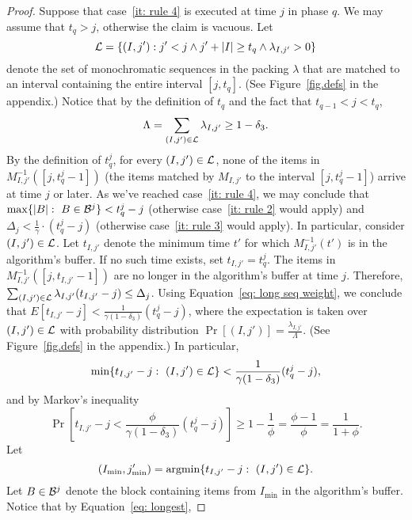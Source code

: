 \documentclass[11pt]{article}
\DeclareMathOperator{\argmin}{argmin}
\begin{document}
\begin{proof}
Suppose that case~\ref{it: rule 4} is executed at time $j$
in phase $q$.
We may assume that $t_q > j$, otherwise the claim is
vacuous. Let
$$
{\cal L} = \{(I,j'): j' < j\wedge j'+|I|\ge t_q
\wedge \lambda_{I,j'} > 0\}
$$
denote the set of monochromatic sequences
in the packing $\lambda$ that are matched
to an interval containing the entire interval
$[j,t_q]$. (See Figure~\ref{fig.defs} in the
appendix.)
Notice that by the definition of $t_q$ and the fact
that $t_{q-1} < j < t_q$,
\begin{equation}\label{eq: long seq weight}
\Lambda = \sum_{(I,j')\in{\cal L}} \lambda_{I,j'}\ge 1 - \delta_3.
\end{equation}
By the definition of $t^j_q$, for every $(I,j')\in {\cal L}$,
none of the items in $M^{-1}_{I,j'}([j,t^j_q-1])$ (the items
matched by $M_{I,j'}$ to the interval $[j,t^j_q-1]$) arrive
at time $j$ or later. As we've reached case~\ref{it: rule 4},
we may conclude that $\max\{|B|:\ B\in {\cal B}^j\} < t^j_q-j$
(otherwise case~\ref{it: rule 2} would apply)
and $\Delta_j < \frac 1 \gamma\cdot (t^j_q-j)$
(otherwise case~\ref{it: rule 3} would apply).
In particular, consider $(I,j')\in {\cal L}$.
Let $t_{I,j'}$ denote the minimum time $t'$
for which $M^{-1}_{I,j'}(t')$ is in the algorithm's
buffer. If no such time exists, set $t_{I,j'} = t^j_q$.
The items in $M^{-1}_{I,j'}([j,t_{I,j'}-1])$ are no longer
in the algorithm's buffer at time $j$. Therefore,
$\sum_{(I,j')\in {\cal L}} \lambda_{I,j'} (t_{I,j'} - j)
\le\Delta_j$. Using Equation~\eqref{eq: long seq weight},
we conclude that
$E[t_{I,j'} - j] < \frac{1}{\gamma (1 - \delta_3)} (t^j_q - j)$,
where the expectation is taken over $(I,j')\in {\cal L}$
with probability distribution
$\Pr[(I,j')] = \frac{\lambda_{I,j'}}{\Lambda}$.
(See Figure~\ref{fig.defs} in the appendix.)
In particular,
\begin{equation}\label{eq: longest}
\min\{t_{I,j'} - j:\ (I,j')\in {\cal L}\} < \frac{1}{\gamma (1 - \delta_3)} (t^j_q - j),
\end{equation}
and by Markov's inequality
\begin{equation}\label{eq: weight of long}
\Pr\left[t_{I,j'} - j < \frac{\phi}{\gamma (1 - \delta_3)} (t^j_q - j)\right] \ge
1 - \frac{1}{\phi} = \frac{\phi-1}{\phi} = \frac{1}{1+\phi}.
\end{equation}
Let
$$
(I_{\min},j'_{\min}) = \argmin\{t_{I,j'} - j:\ (I,j')\in {\cal L}\}.
$$
Let $B\in {\cal B}^j$ denote the block containing items from
$I_{\min}$ in the algorithm's buffer.
Notice that by Equation~\eqref{eq: longest},

\end{proof}
\end{document}

